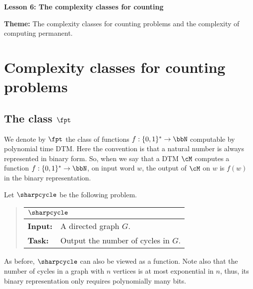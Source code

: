\documentclass[11pt, a4paper]{article}
\renewcommand{\lesson}{6}
\renewcommand{\lessontitle}{The complexity classes for counting}
\renewcommand{\fulltitle}{Lesson \lesson: \lessontitle}
\begin{document}
\date{}



\begin{center}
{\Large {\bf \fulltitle}}
\end{center}
\vspace{0.5cm}

\noindent
{\bf Theme:} The complexity classes for counting problems and the complexity of computing permanent.



\section{Complexity classes for counting problems}
\label{sec:counting-class}


\subsection{The class $\fpt$}
\label{subsec:fpt}

We denote by $\fpt$ the class of functions $f:\{0,1\}^*\to \bbN$
computable by polynomial time DTM.
Here the convention is that a natural number is always represented in binary form.
So, when we say that a DTM $\cM$ computes a function $f:\{0,1\}^*\to\bbN$,
on input word $w$, the output of $\cM$ on $w$ is $f(w)$ in the binary representation.

Let $\sharpcycle$ be the following problem.
\begin{quote}
{\def\arraystretch{1.25}
\begin{tabular}{|ll|}
\hline
\multicolumn{2}{|l|}{$\sharpcycle$}
\\
\hline
{\bf Input:}
&
A directed graph $G$.
\\
{\bf Task:}
&
Output the number of cycles in $G$.
\\
\hline
\end{tabular}}
\end{quote}
As before, $\sharpcycle$ can also be viewed as a function.
Note also that the number of cycles in a graph with $n$ vertices is at most exponential in $n$,
thus, its binary representation only requires polynomially many bits.
 
\end{document}
